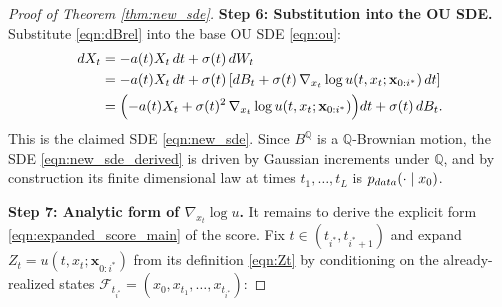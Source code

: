 \documentclass{article}
\newcommand{\pdata}{p_{\normalfont{data}}}
\newcommand{\QQ}{\mathbb{Q}}
\begin{document}
\begin{proof}[Proof of Theorem \ref{thm:new_sde}]
\noindent\textbf{Step 6: Substitution into the OU SDE.}
Substitute \eqref{eqn:dBrel} into the base OU SDE \eqref{eqn:ou}:
\begin{align}
  dX_t
  &= -a(t)X_t\,dt + \sigma(t)\,dW_t \nonumber\\
  &= -a(t)X_t\,dt
     + \sigma(t)\left[dB_t + \sigma(t)\,\nabla_{x_t}\log u(t,x_t;\mathbf{x}_{0:i^*})\,dt\right]
     \nonumber\\
  &= \Bigl(-a(t)X_t + \sigma(t)^2\,\nabla_{x_t}\log u(t,x_t;\mathbf{x}_{0:i^*})\Bigr)dt
     + \sigma(t)\,dB_t. \label{eqn:new_sde_derived}
\end{align}
This is the claimed SDE \eqref{eqn:new_sde}.  Since $B^{\QQ}$ is a $\QQ$-Brownian
motion, the SDE \eqref{eqn:new_sde_derived} is driven by Gaussian increments under
$\QQ$, and by construction its finite dimensional law at times $t_1,\ldots,t_L$ is
$\pdata(\cdot\mid x_0)$.

\noindent\textbf{Step 7: Analytic form of $\nabla_{x_t}\log u$.}
It remains to derive the explicit form \eqref{eqn:expanded_score_main} of the score.
Fix $t\in(t_{i^*},t_{i^*+1})$ and expand $Z_t=u(t,x_t;\mathbf{x}_{0:i^*})$ from its definition
\eqref{eqn:Zt} by conditioning on the already-realized states
$\mathcal{F}_{t_{i^*}}=(x_0,x_{t_1},\ldots,x_{t_{i^*}})$:



\end{proof}
\end{document}

